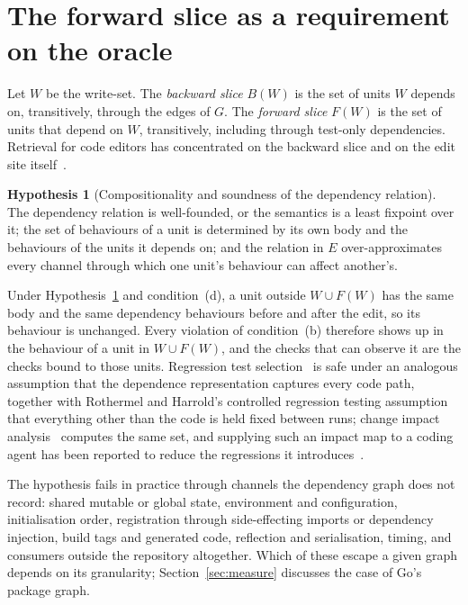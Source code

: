 \documentclass[10pt]{article}
\theoremstyle{definition}
\newtheorem{hypothesis}{Hypothesis}
\theoremstyle{plain}
\theoremstyle{remark}
\begin{document}
\section{The forward slice as a requirement on the oracle}\label{sec:forward}

Let $W$ be the write-set. The \emph{backward slice} $B(W)$ is the set of units $W$ depends on, transitively, through the edges of $G$. The \emph{forward slice} $F(W)$ is the set of units that depend on $W$, transitively, including through test-only dependencies. Retrieval for code editors has concentrated on the backward slice and on the edit site itself~\cite{shrivastava2023repo,zhang2023repocoder,xia2025agentless,bairi2024codeplan}.

\begin{hypothesis}[Compositionality and soundness of the dependency relation]\label{hyp:comp}
The dependency relation is well-founded, or the semantics is a least fixpoint over it; the set of behaviours of a unit is determined by its own body and the behaviours of the units it depends on; and the relation in $E$ over-approximates every channel through which one unit's behaviour can affect another's.
\end{hypothesis}

Under Hypothesis~\ref{hyp:comp} and condition~(d), a unit outside $W \cup F(W)$ has the same body and the same dependency behaviours before and after the edit, so its behaviour is unchanged. Every violation of condition~(b) therefore shows up in the behaviour of a unit in $W \cup F(W)$, and the checks that can observe it are the checks bound to those units. Regression test selection~\cite{rothermel1997safe} is safe under an analogous assumption that the dependence representation captures every code path, together with Rothermel and Harrold's controlled regression testing assumption that everything other than the code is held fixed between runs; change impact analysis~\cite{ren2004chianti} computes the same set, and supplying such an impact map to a coding agent has been reported to reduce the regressions it introduces~\cite{alonso2026tdad}.

The hypothesis fails in practice through channels the dependency graph does not record: shared mutable or global state, environment and configuration, initialisation order, registration through side-effecting imports or dependency injection, build tags and generated code, reflection and serialisation, timing, and consumers outside the repository altogether. Which of these escape a given graph depends on its granularity; Section~\ref{sec:measure} discusses the case of Go's package graph.
\end{document}
